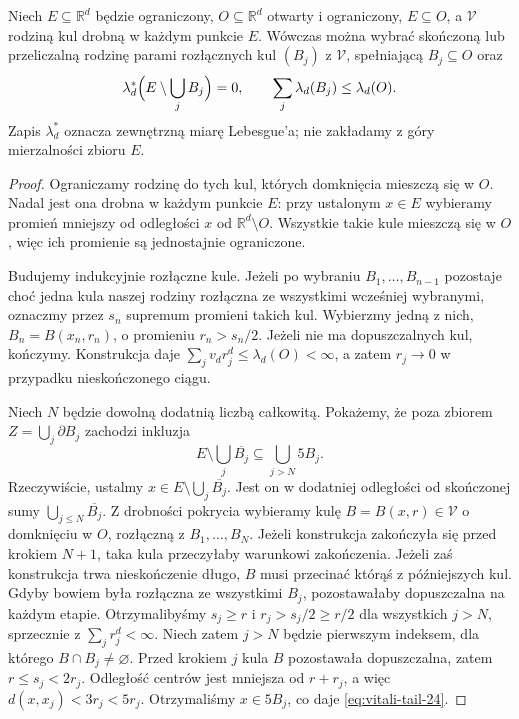 \begin{twierdzenie}
\label{thm:vitali-cover-24}
Niech $E\subseteq\mathbb R^d$ będzie ograniczony,
$O\subseteq\mathbb R^d$ otwarty i ograniczony, $E\subseteq O$,
a $\mathcal V$ rodziną kul drobną w każdym punkcie $E$.
Wówczas można wybrać skończoną lub przeliczalną rodzinę
parami rozłącznych kul $(B_j)$ z $\mathcal V$, spełniającą
$B_j\subseteq O$ oraz
\[
 \lambda_d^*\Bigl(E\setminus\bigcup_jB_j\Bigr)=0,
 \qquad \sum_j\lambda_d(B_j)\le\lambda_d(O).
\]
Zapis $\lambda_d^*$ oznacza zewnętrzną miarę Lebesgue'a;
nie zakładamy z góry mierzalności zbioru $E$.
\end{twierdzenie}
\begin{proof}
Ograniczamy rodzinę do tych kul, których domknięcia mieszczą
się w $O$. Nadal jest ona drobna w każdym punkcie $E$:
przy ustalonym $x\in E$ wybieramy promień mniejszy od
odległości $x$ od $\mathbb R^d\setminus O$.
Wszystkie takie kule mieszczą się w $O$, więc ich promienie
są jednostajnie ograniczone.

Budujemy indukcyjnie rozłączne kule. Jeżeli po wybraniu
$B_1,\ldots,B_{n-1}$ pozostaje choć jedna kula naszej rodziny
rozłączna ze wszystkimi wcześniej wybranymi, oznaczmy przez
$s_n$ supremum promieni takich kul. Wybierzmy jedną z nich,
$B_n=B(x_n,r_n)$, o promieniu $r_n>s_n/2$. Jeżeli nie ma
dopuszczalnych kul, kończymy. Konstrukcja daje
$\sum_jv_dr_j^d\le\lambda_d(O)<\infty$, a zatem
$r_j\to0$ w przypadku nieskończonego ciągu.

Niech $N$ będzie dowolną dodatnią liczbą całkowitą.
Pokażemy, że poza zbiorem
$Z=\bigcup_j\partial B_j$ zachodzi inkluzja
\begin{equation}\label{eq:vitali-tail-24}
 E\setminus\bigcup_j\overline{B_j}
 \subseteq\bigcup_{j>N}5B_j.
\end{equation}
Rzeczywiście, ustalmy $x\in E\setminus\bigcup_j\overline{B_j}$.
Jest on w dodatniej odległości od skończonej sumy
$\bigcup_{j\le N}\overline{B_j}$. Z drobności pokrycia
wybieramy kulę $B=B(x,r)\in\mathcal V$ o domknięciu
w $O$, rozłączną z $B_1,\ldots,B_N$.
Jeżeli konstrukcja zakończyła się przed krokiem $N+1$,
taka kula przeczyłaby warunkowi zakończenia. Jeżeli zaś
konstrukcja trwa nieskończenie długo, $B$ musi przecinać
którąś z późniejszych kul. Gdyby bowiem była rozłączna
ze wszystkimi $B_j$, pozostawałaby dopuszczalna na
każdym etapie. Otrzymalibyśmy $s_j\ge r$ i
$r_j>s_j/2\ge r/2$ dla wszystkich $j>N$,
sprzecznie z $\sum_jr_j^d<\infty$.
Niech zatem $j>N$ będzie pierwszym indeksem, dla
którego $B\cap B_j\ne\varnothing$.
Przed krokiem $j$ kula $B$ pozostawała dopuszczalna,
zatem $r\le s_j<2r_j$. Odległość centrów jest mniejsza
od $r+r_j$, a więc $d(x,x_j)<3r_j<5r_j$.
Otrzymaliśmy $x\in5B_j$, co daje \eqref{eq:vitali-tail-24}.


\end{proof}
